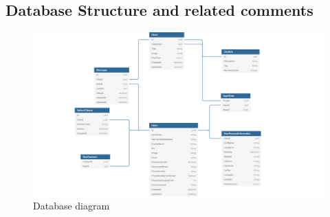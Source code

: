 \subsection{Database Structure and related comments}\label{subsec:database-structure-and-related-comments}
\begin{figure}[H]
    \centering
    \includegraphics[width=1\textwidth]{Pictures/DB_diagram}
    \caption{Database diagram}\label{fig:figure5}
\end{figure}

